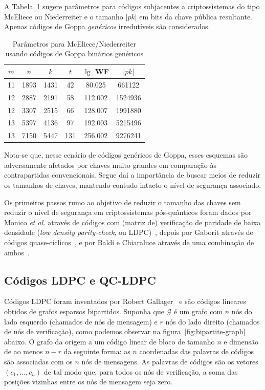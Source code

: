 \documentclass{SBCbookchapter}
\begin{document}
\begin{otherlanguage}{brazilian}
A Tabela~\ref{tab:generic-params} sugere parâmetros para códigos subjacentes a criptossistemas do tipo McEliece ou Niederreiter e o tamanho $|pk|$ em bits da chave pública resultante. Apenas códigos de Goppa \emph{genéricos} irredutíveis são considerados.

\begin{table}\centering
\caption{Parâmetros para McEliece/Niederreiter usando códigos de Goppa binários genéricos}\label{tab:generic-params}
\begin{tabular}{|cccccc|}
\hline
$m$ & $n$  & $k$  & $t$ & $\lg$ WF & $|pk|$ \\
\hline
11  & 1893 & 1431 &  42 &  80.025 &  661122 \\
12  & 2887 & 2191 &  58 & 112.002 & 1524936 \\
12  & 3307 & 2515 &  66 & 128.007 & 1991880 \\
13  & 5397 & 4136 &  97 & 192.003 & 5215496 \\
13  & 7150 & 5447 & 131 & 256.002 & 9276241 \\
\hline
\end{tabular}
\end{table}

Nota-se que, nesse cenário de códigos genéricos de Goppa, esses esquemas são adversamente afetados por chaves muito grandes em comparação às contrapartidas convencionais. Segue daí a importância de buscar meios de reduzir os tamanhos de chaves, mantendo contudo intacto o nível de segurança associado.

Os primeiros passos rumo ao objetivo de reduzir o tamanho das chaves sem reduzir o nível de segurança em criptossistemas pós-quânticos foram dados por Monico \emph{et al.} através de códigos com (matriz de) verificação de paridade de baixa densidade (\emph{low density parity-check}, ou LDPC)~\cite{monico-rosenthal-shokrollahi}, depois por Gaborit através de códigos quase-cíclicos~\cite{gaborit}, e por Baldi e Chiaraluce através de uma combinação de ambos~\cite{baldi-chiaraluce}.


\subsection{Códigos LDPC e QC-LDPC}\label{subsec:qcldpc}

Códigos LDPC foram inventados por Robert Gallager~\cite{gallager} e são códigos lineares obtidos de grafos esparsos bipartidos. Suponha que $\mathscr{G}$ é um grafo com $n$ nós do lado esquerdo (chamados de nós de mensagem) e $r$ nós do lado direito (chamados de nós de verificação), como podemos observar na figura~\ref{fig:bipartite-graph} abaixo. O grafo da origem a um código linear de bloco de tamanho $n$ e dimensão de ao menos $n - r$ da seguinte forma: as $n$ coordenadas das palavras de códigos são associadas com os $n$ nós de mensagens. As palavras de códigos são os vetores $(c_1, \dots, c_n)$ de tal modo que, para todos os nós de verificação, a soma das posições vizinhas entre os nós de mensagem seja zero.


\end{otherlanguage}
\end{document}
